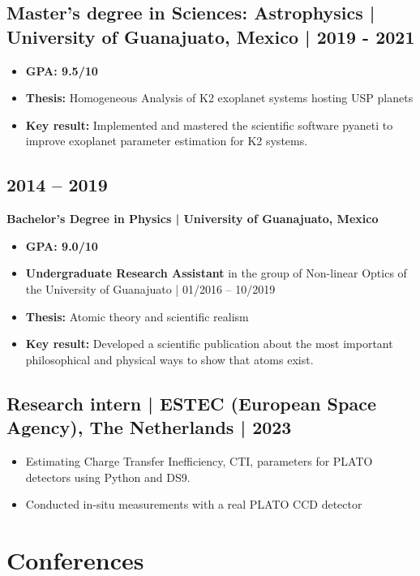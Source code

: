 \documentclass[11pt,a4paper]{article}
\begin{document}
\begin{multicols}{2}
		\subsection{Master's degree in Sciences: Astrophysics | University of Guanajuato, Mexico | 2019 - 2021}
		\begin{itemize}
		\item \textbf{GPA: 9.5/10}
		\item \textbf{Thesis:} Homogeneous Analysis of K2 exoplanet systems hosting USP planets
		\item \textbf{Key result:} Implemented and mastered the scientific software pyaneti to improve exoplanet parameter estimation for K2 systems. 
		\end{itemize}
		
		\subsection{2014 – 2019}
		\textbf{Bachelor's Degree in Physics | University of Guanajuato, Mexico}
		\begin{itemize}
			\item \textbf{GPA: 9.0/10}
			\item \textbf{Undergraduate Research Assistant} in the group of Non-linear Optics of the University of Guanajuato | 01/2016 – 10/2019
			\item \textbf{Thesis:} Atomic theory and scientific realism
			\item \textbf{Key result:} Developed a scientific publication about the most important philosophical and physical ways to show that atoms exist. 
		\end{itemize}
		
		\subsection{Research intern | ESTEC (European Space Agency), The Netherlands | 2023}
		\begin{itemize}
			\item Estimating Charge Transfer Inefficiency, CTI, parameters for PLATO detectors using Python and DS9.
			\item Conducted in-situ measurements with a real PLATO CCD detector
		\end{itemize}
	\end{multicols}
	
	\section{Conferences}
\end{document}
